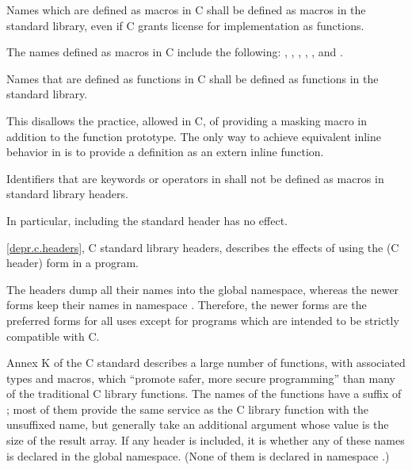 \pnum
Names which are defined as macros in C shall be defined as macros in the \Cpp{}
standard library, even if C grants license for implementation as functions.
\begin{note}
The names defined as macros in C include the following:
, , , ,
, and .
\end{note}

\pnum
Names that are defined as functions in C shall be defined as functions in the
\Cpp{} standard library.
\begin{footnote}
This disallows the practice, allowed in C, of
providing a masking macro in addition to the function prototype. The only way to
achieve equivalent inline behavior in \Cpp{} is to provide a definition as an
extern inline function.
\end{footnote}

\pnum
Identifiers that are keywords or operators in \Cpp{} shall not be defined as
macros in \Cpp{} standard library headers.
\begin{footnote}
In particular, including the
standard header  has no effect.
\end{footnote}

\pnum
\ref{depr.c.headers}, C standard library headers, describes the effects of using
the  (C header) form in a \Cpp{} program.
\begin{footnote}
 The
 headers dump all their names into the global namespace, whereas the
newer forms keep their names in namespace . Therefore, the newer
forms are the preferred forms for all uses except for \Cpp{} programs which are
intended to be strictly compatible with C.
\end{footnote}

\pnum
Annex K of the C standard describes a large number of functions,
with associated types and macros,
which ``promote safer, more secure programming''
than many of the traditional C library functions.
The names of the functions have a suffix of ;
most of them provide the same service
as the C library function with the unsuffixed name,
but generally take an additional argument
whose value is the size of the result array.
If any \Cpp{} header is included,
it is 
whether any of these names
is declared in the global namespace.
(None of them is declared in namespace .)


